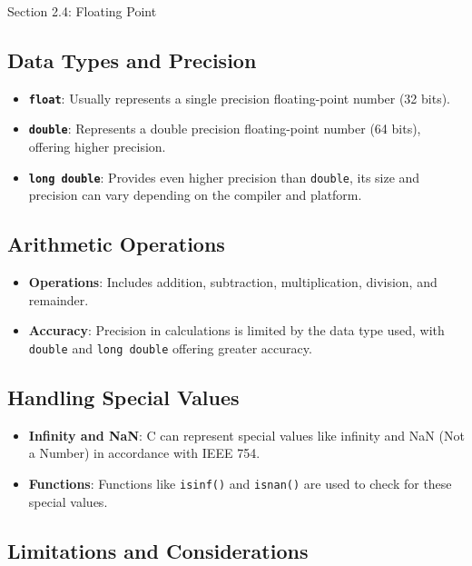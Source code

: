 \begin{notes}{Section 2.4: Floating Point}
    \subsection*{Data Types and Precision}
    
    \begin{itemize}
        \item \textbf{\texttt{float}}: Usually represents a single precision floating-point number (32 bits).
        \item \textbf{\texttt{double}}: Represents a double precision floating-point number (64 bits), offering higher precision.
        \item \textbf{\texttt{long double}}: Provides even higher precision than \texttt{double}, its size and precision can vary depending on the compiler and platform.
    \end{itemize}
    
    \subsection*{Arithmetic Operations}
    
    \begin{itemize}
        \item \textbf{Operations}: Includes addition, subtraction, multiplication, division, and remainder.
        \item \textbf{Accuracy}: Precision in calculations is limited by the data type used, with \texttt{double} and \texttt{long double} offering greater accuracy.
    \end{itemize}
    
    \subsection*{Handling Special Values}
    
    \begin{itemize}
        \item \textbf{Infinity and NaN}: C can represent special values like infinity and NaN (Not a Number) in accordance with IEEE 754.
        \item \textbf{Functions}: Functions like \texttt{isinf()} and \texttt{isnan()} are used to check for these special values.
    \end{itemize}
    
    \subsection*{Limitations and Considerations}
    

\end{notes}
